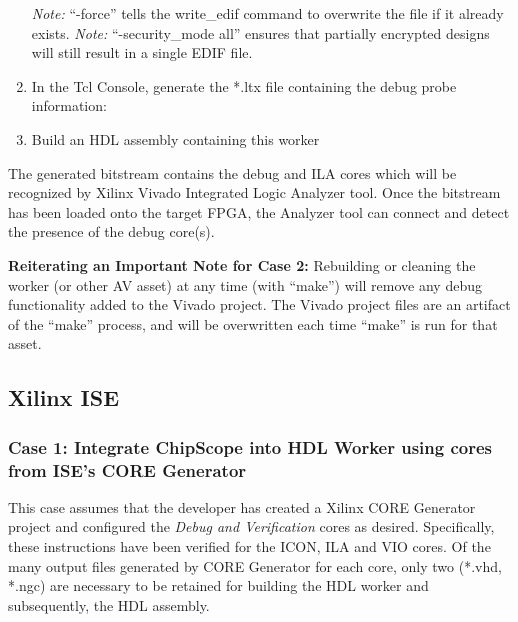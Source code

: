 \begin{flushleft}
\begin{enumerate}
			\subitem {}
			\subitem \textit{Note:} ``-force'' tells the write\_edif command to overwrite the file if it already exists.
			\subitem \textit{Note:} ``-security\_mode all'' ensures that partially encrypted designs will still result in a single EDIF file.
		\item In the Tcl Console, generate the *.ltx file containing the debug probe information:
			\subitem {}
		\item Build an HDL assembly containing this worker
	\end{enumerate}
The generated bitstream contains the debug and ILA cores which will be recognized by Xilinx Vivado Integrated Logic Analyzer tool. Once the bitstream has been loaded onto the target FPGA, the Analyzer tool can connect and detect the presence of the debug core(s).\newline

\textbf{Reiterating an Important Note for Case 2:} Rebuilding or cleaning the worker (or other AV asset) at any time (with ``make'') will remove any debug functionality added to the Vivado project. The Vivado project files are an artifact of the ``make'' process, and will be overwritten each time ``make'' is run for that asset.


\subsection{Xilinx ISE}
	\subsubsection{Case 1: Integrate ChipScope into HDL Worker using cores from ISE's CORE Generator}
\label{ise1}
		This case assumes that the developer has created a Xilinx CORE Generator project and configured the \textit{Debug and Verification} cores as desired. Specifically, these instructions have been verified for the ICON, ILA and VIO cores. Of the many output files generated by CORE Generator for each core, only two (*.vhd, *.ngc) are necessary to be retained for building the HDL worker and subsequently, the HDL assembly.


\end{flushleft}
